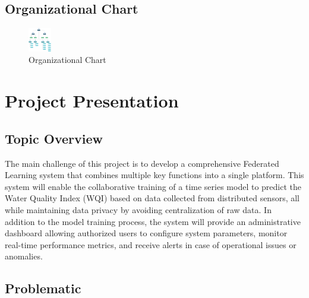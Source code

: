 \subsection{Organizational Chart}

\begin{figure}[H] 
    \centering
    \includegraphics[width=1cm]{Figures/Organizational_Chart.png}
    \caption{Organizational Chart}
\end{figure}


\section{Project Presentation}
\subsection{Topic Overview}


The main challenge of this project is to develop a comprehensive Federated Learning system that combines multiple key functions into a single platform. This system will enable the collaborative training of a time series model to predict the Water Quality Index (WQI) based on data collected from distributed sensors, all while maintaining data privacy by avoiding centralization of raw data. In addition to the model training process, the system will provide an administrative dashboard allowing authorized users to configure system parameters, monitor real-time performance metrics, and receive alerts in case of operational issues or anomalies. 

\subsection{Problematic}

